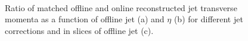  \begin{figure}[hbtp]
  \centering
  \hfill
   \\
  \caption[Jet response as a function of jet \pt and $\eta$]{Ratio of matched offline and online reconstructed jet
transverse momenta as a function of offline jet \pt (a) and $\eta$ (b) for different jet corrections and in slices of
offline jet \pt (c).}
\label{fig:top_hlt_jet_response} 
\end{figure}

